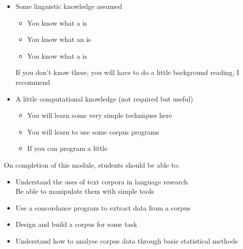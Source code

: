 \documentclass[a4paper,landscape,headrule,footrule,xetex]{foils}
\begin{document}

\begin{itemize}
\item Some linguistic knowledge assumed
  \begin{itemize}
  \item You know what a  is
  \item You know what an  is
  \item You know what a  is
  \end{itemize}
 If you don't know these, you will have to do a little background
 reading, I recommend \citet{Huddleston:1988} 
\item A little computational knowledge (not required but useful)
  \begin{itemize}
  \item You will learn some very simple techniques here
  \item You will learn to use some corpus programs
  \item If you can program a little 
  \end{itemize}
\end{itemize}




On completion of this module, students should be able to:

\begin{itemize}
\item Understand the uses of text corpora in language research
  \\ Be able to manipulate them with simple tools
\item Use a concordance program to extract data from a corpus
\item Design and build a corpus for some task
\item Understand how to analyse corpus data through basic statistical methods
\end{itemize}
    
\end{document}
